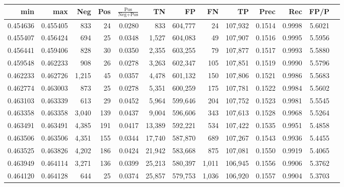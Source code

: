 \begin{tabular}{rrrrrrrrrrrrr}
\toprule
     min &      max &   Neg &   Pos & $\frac{\text{Pos}}{\text{Neg}+\text{Pos}}$ &      TN &      FP &      FN &      TP &   Prec &    Rec &   FP/P \\
\midrule
0.454636 & 0.455405 &   833 &    24 &                                     0.0280 &     833 & 604,777 &      24 & 107,932 & 0.1514 & 0.9998 & 5.6021 \\
0.455407 & 0.456424 &   694 &    25 &                                     0.0348 &   1,527 & 604,083 &      49 & 107,907 & 0.1516 & 0.9995 & 5.5956 \\
0.456441 & 0.459406 &   828 &    30 &                                     0.0350 &   2,355 & 603,255 &      79 & 107,877 & 0.1517 & 0.9993 & 5.5880 \\
0.459548 & 0.462233 &   908 &    26 &                                     0.0278 &   3,263 & 602,347 &     105 & 107,851 & 0.1519 & 0.9990 & 5.5796 \\
0.462233 & 0.462726 & 1,215 &    45 &                                     0.0357 &   4,478 & 601,132 &     150 & 107,806 & 0.1521 & 0.9986 & 5.5683 \\
0.462774 & 0.463003 &   873 &    25 &                                     0.0278 &   5,351 & 600,259 &     175 & 107,781 & 0.1522 & 0.9984 & 5.5602 \\
0.463103 & 0.463339 &   613 &    29 &                                     0.0452 &   5,964 & 599,646 &     204 & 107,752 & 0.1523 & 0.9981 & 5.5545 \\
0.463358 & 0.463358 & 3,040 &   139 &                                     0.0437 &   9,004 & 596,606 &     343 & 107,613 & 0.1528 & 0.9968 & 5.5264 \\
0.463491 & 0.463491 & 4,385 &   191 &                                     0.0417 &  13,389 & 592,221 &     534 & 107,422 & 0.1535 & 0.9951 & 5.4858 \\
0.463506 & 0.463506 & 4,351 &   155 &                                     0.0344 &  17,740 & 587,870 &     689 & 107,267 & 0.1543 & 0.9936 & 5.4455 \\
0.463525 & 0.463826 & 4,202 &   186 &                                     0.0424 &  21,942 & 583,668 &     875 & 107,081 & 0.1550 & 0.9919 & 5.4065 \\
0.463949 & 0.464114 & 3,271 &   136 &                                     0.0399 &  25,213 & 580,397 &   1,011 & 106,945 & 0.1556 & 0.9906 & 5.3762 \\
0.464120 & 0.464128 &   644 &    25 &                                     0.0374 &  25,857 & 579,753 &   1,036 & 106,920 & 0.1557 & 0.9904 & 5.3703 \\

\end{tabular}
